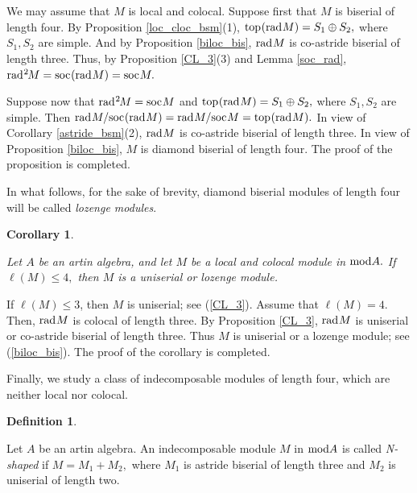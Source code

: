 \documentclass[10pt]{amsart}
\newtheorem{Cor}[Theo]{Corollary}
\theoremstyle{definition}
\newtheorem{Defn}[Theo]{Definition}
\newcommand{\mmod}{{\rm mod}}
\newcommand{\rad}{{\rm rad}\hspace{.5pt}}
\newcommand{\soc}{{\rm soc}\hspace{.5pt}}
\newcommand{\ntop}{{\rm top}\hspace{.5pt}}
\begin{document}
 \vspace{-1.5pt}
 
 We may assume that $M$ is local and colocal. Suppose first that $M$ is biserial of length four. By Proposition \ref{loc_cloc_bsm}(1), $\ntop(\rad M)=S_1\oplus S_2,$ where $S_1, S_2$ are simple. And by Proposition \ref{biloc_bis}, $\rad M$ is co-astride biserial of length three. Thus, by Proposition \ref{CL_3}(3) and Lemma \ref{soc_rad}, $\rad^2\hspace{-1pt} M=\soc(\rad M)=\soc M.$ 

Suppose now that $\rad^2\hspace{-1pt}M=\soc M$ and $\ntop(\rad M)=S_1\oplus S_2,$ where $S_1, S_2$ are simple. Then 
$\rad M/\soc(\rad M)=\rad M/\soc M=\ntop(\rad M).$ In view of Corollary \ref{astride_bsm}(2), $\rad M$ is co-astride biserial of length three. In view of  Proposition \ref{biloc_bis}, $M$ is diamond biserial of length four. The proof of the proposition is completed.

\smallskip

In what follows, for the sake of brevity, diamond biserial modules of length four will be called {\it lozenge modules}.

\begin{Cor}\label{rb4_lozenge} 

Let $A$ be an artin algebra, and let $M$ be a local and colocal module in $\mmod A.$ If $\ell(M)\le 4,$ then $M$ is a uniserial or lozenge module. 

\end{Cor} 


 If $\ell(M)\le 3$, then $M$ is uniserial; see (\ref{CL_3}). Assume that $\ell(M)=4$. Then, $\rad M$ is colocal of length three. By Proposition \ref{CL_3},  $\rad M$ is uniserial or co-astride biserial of length three. Thus $M$ is uniserial or a lozenge module; see (\ref{biloc_bis}). The proof of the corollary is completed. 

\smallskip

Finally, we study a class of indecomposable modules of length four, which are neither local nor colocal.

\begin{Defn}\label{N_mod_def}

Let $A$ be an artin algebra. An indecomposable module $M$ in $\mmod A$ is called {\it N-shaped} if $M=M_1+M_2,$ where $M_1$ is astride biserial of length three and $M_2$ is uniserial of length two.

\end{Defn}
\end{document}

